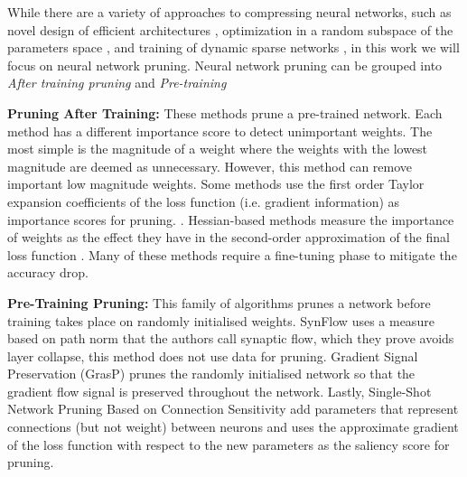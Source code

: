 While there are a variety of approaches to compressing neural networks, such
as novel design of efficient architectures
\cite{tanEfficientNetRethinkingModel2019,
howardMobileNetsEfficientConvolutional2017,
sandlerMobileNetV2InvertedResiduals2019}, optimization in a random subspace of
the
parameters space \cite{liMeasuringIntrinsicDimension2022}, and training of dynamic sparse networks 
\cite{mocanuScalableTrainingArtificial2018a,bellecDeepRewiringTraining2018,
evciRiggingLotteryMaking2020,dettmersSparseNetworksScratch2019} , in this work we will focus on neural network pruning.
Neural network pruning can be grouped into \textit{After training pruning}
and  \textit{Pre-training } 

\textbf{Pruning After Training:} These methods prune a pre-trained network.
Each method has a different importance score to detect unimportant weights.
The most simple is the magnitude of a weight
\cite{hanLearningBothWeights2015a,hanDeepCompressionCompressing2016a} where the
weights with the lowest magnitude are deemed as
 unnecessary. However, this method can remove important low magnitude weights.
 Some methods use the first order Taylor expansion coefficients of the  loss function (i.e. gradient information)  as importance scores for pruning. \cite{karninsimpleprocedurepruning1990a,mozerskeletonizationtechniquetrimming1988}.
 Hessian-based methods measure the importance of weights as the effect they
 have in the second-order approximation of the final loss function 
 \cite{hassibiSecondOrderDerivatives1992,lecunOptimalBrainDamage1989,
 hassibiOptimalBrainSurgeon1993,singhWoodFisherEfficientSecondOrder2020}.
 Many of these methods require a fine-tuning phase to mitigate the accuracy
 drop.




\textbf{Pre-Training Pruning:} This family of algorithms prunes a
network before training takes place on randomly initialised weights. SynFlow
\cite{tanakaPruningNeuralNetworks2020a} uses a measure based on path norm
\cite{neyshaburPathSGDPathNormalizedOptimization2015} that the authors call
synaptic flow, which they prove avoids layer collapse, this method does not use
data for pruning. Gradient Signal Preservation
(GrasP) \cite{wangPickingWinningTickets2020} prunes the randomly initialised network so that the
gradient flow signal is preserved throughout the network.
Lastly, Single-Shot Network Pruning Based on Connection Sensitivity
\cite{leeSNIPSINGLESHOTNETWORK2018} add parameters that represent
connections (but not weight) between neurons and uses the approximate
gradient of the loss function with respect to the new parameters as the
saliency score for pruning. 

